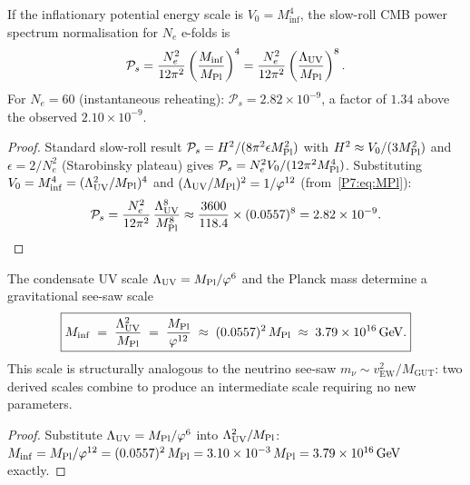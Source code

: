\begin{theorem}
\label{P7:thm:Ps_seesaw}
If the inflationary potential energy scale is $V_0 = M_{\mathrm{inf}}^4$,
the slow-roll CMB power spectrum normalisation for $N_e$ e-folds is
\begin{equation}
  \mathcal{P}_s
  = \frac{N_e^2}{12\pi^2}\left(\frac{M_{\mathrm{inf}}}{M_{\mathrm{Pl}}}\right)^4
  = \frac{N_e^2}{12\pi^2}\left(\frac{\Lambda_{\mathrm{UV}}}{M_{\mathrm{Pl}}}\right)^8.
  \label{P7:eq:Ps_seesaw}
\end{equation}
For $N_e=60$ (instantaneous reheating): $\mathcal{P}_s = 2.82\times10^{-9}$,
a factor of $1.34$ above the observed $2.10\times10^{-9}$.
\end{theorem}
\begin{proof}
Standard slow-roll result $\mathcal{P}_s=H^2/(8\pi^2\epsilon M_{\mathrm{Pl}}^2)$
with $H^2\approx V_0/(3M_{\mathrm{Pl}}^2)$ and $\epsilon=2/N_e^2$ (Starobinsky
plateau) gives $\mathcal{P}_s=N_e^2V_0/(12\pi^2M_{\mathrm{Pl}}^4)$. Substituting
$V_0=M_{\mathrm{inf}}^4=(\Lambda_{\mathrm{UV}}^2/M_{\mathrm{Pl}})^4$ and $(\Lambda_{\mathrm{UV}}/M_{\mathrm{Pl}})^2=1/\varphi^{12}$
(from~\eqref{P7:eq:MPl}):
\[
  \mathcal{P}_s
  = \frac{N_e^2}{12\pi^2}\,\frac{\Lambda_{\mathrm{UV}}^8}{M_{\mathrm{Pl}}^8}
  \approx \frac{3600}{118.4}\times(0.0557)^8
  = 2.82\times10^{-9}.
\]
\end{proof}

\begin{proposition}
\label{P7:prop:seesaw}
The condensate UV scale $\Lambda_{\mathrm{UV}}=M_{\mathrm{Pl}}/\varphi^6$ and the Planck mass
determine a gravitational see-saw scale
\begin{equation}
  \boxed{M_{\mathrm{inf}} \;=\; \frac{\Lambda_{\mathrm{UV}}^2}{M_{\mathrm{Pl}}}
  \;=\; \frac{M_{\mathrm{Pl}}}{\varphi^{12}}
  \;\approx\; (0.0557)^2\,M_{\mathrm{Pl}}
  \;\approx\; 3.79\times10^{16}\,\mathrm{GeV}.}
  \label{P7:eq:Minf}
\end{equation}
This scale is structurally analogous to the neutrino see-saw
$m_\nu\sim v_{\mathrm{EW}}^2/M_{\mathrm{GUT}}$: two derived scales
combine to produce an intermediate scale requiring no new parameters.
\end{proposition}
\begin{proof}
Substitute $\Lambda_{\mathrm{UV}}=M_{\mathrm{Pl}}/\varphi^6$ into $\Lambda_{\mathrm{UV}}^2/M_{\mathrm{Pl}}$:
$M_{\mathrm{inf}}=M_{\mathrm{Pl}}/\varphi^{12}=(0.0557)^2\,M_{\mathrm{Pl}}=3.10\times10^{-3}\,M_{\mathrm{Pl}}
=3.79\times10^{16}\,\mathrm{GeV}$ exactly.
\end{proof}

